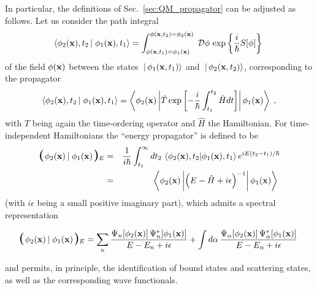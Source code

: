\documentclass[a4paper,preprint,draft,showpacs,amsmath,amsfonts,amssymb,aps,prd]{revtex4}%
\begin{document}
In particular, the definitions of Sec.~\ref{sec:QM_propagator}
can be adjusted as follows.
Let us consider the path integral 
\begin{equation} 
\left\langle 
\phi_{2} ({\bf x}), t_{2} \left| \right. 
\phi_{1}({\bf x}), t_{1}
\right\rangle   
 = 
\int_{\phi( {\bf x}, t_{1})  
=  \phi_{1} ( {\bf x}) }^{ \phi({\bf x} , t_{2}) 
 =  \phi_{2} ( {\bf x} ) }  
 \;  
{\cal D}  \phi  \,
\exp \left\{ {\frac{i}{\hbar} S [\phi]} \right\}
\;  
\label{eq:position_propagator}
\end{equation}
of the field $\phi ({\bf x})$ between the states 
$\left. \left. \right| \phi_{1}({\bf x}, t_{1}) \right\rangle $
and
$\left. \left. \right| \phi_{2}({\bf x}, t_{2}) \right\rangle $, 
corresponding to the propagator 
\begin{equation} 
\left\langle 
\phi_{2} ({\bf x}), t_{2} \left| \right. 
\phi_{1}({\bf x}), t_{1}
\right\rangle 
=
\left\langle \phi_{2}  ({\bf x}) \left| 
\hat{T}
\exp \left[
 -\frac{i}{\hbar} \int_{t_{1}}^{t_{2}}
\hat{H} dt 
\right]
\right| \phi_{1}  ({\bf x}) \right\rangle   
\; ,
\label{eq:position_propagator2}
\end{equation}
with $\hat{T}$ being again the time-ordering operator
and  $\hat{H}$ the Hamiltonian.
For time-independent  Hamiltonians
the ``energy propagator'' is defined to be
\begin{eqnarray}
\mbox{\boldmath\Large  $\left(  \right.$ } \! \! \!  
\phi_{2}({\bf x}) 
\left| \right.
 \phi_{1}({\bf x}) 
\mbox{\boldmath\Large  $\left.  \right)$ } \! \! \!_{E}
&  = & 
\frac{1}{i \hbar}
\int_{t_{1}}^{\infty}
d t_{2}
\,
\left\langle \phi_{2} ({\bf x}), t_{2} | \phi_{1}({\bf x}), t_{1}
\right\rangle   
e^{i  E (t_{2}-t_{1})/\hbar }
\nonumber 
\\
& = &
\left\langle \phi_{2}({\bf x}) 
\left|
\left( 
E - \hat{H} + i \epsilon 
\right)^{-1}
 \right|
\phi_{1}({\bf x}) \right\rangle   
\; 
\label{eq:energy_propagator}
\end{eqnarray}
(with  $i\epsilon$ being a small positive imaginary part),
which admits a spectral representation
\begin{widetext}
\begin{equation}
\mbox{\boldmath\Large  $\left(  \right.$ } \! \! \!  
\phi_{2}({\bf x}) 
\left| \right.
 \phi_{1}({\bf x}) 
\mbox{\boldmath\Large  $\left.  \right)$ } \! \! \!_{E}
=
\sum_{n}
\frac{\Psi_{n}[\phi_{2}({\bf x})]  \,
\Psi_{n}^{*}[\phi_{1}({\bf x})]}{E-E_{n} +i \epsilon}
+
\int d \alpha
\,
\frac{\Psi_{\alpha}[\phi_{2}({\bf x})]  \,
\Psi_{\alpha}^{*}
[\phi_{1}({\bf x})]}{E-E_{\alpha} +i \epsilon}
\;  
\label{eq:energy_propagator_states_QFT}
\end{equation}
\end{widetext}
and permits, in principle, the identification
of bound states and scattering states, as well as the corresponding
wave functionals.
\end{document}
